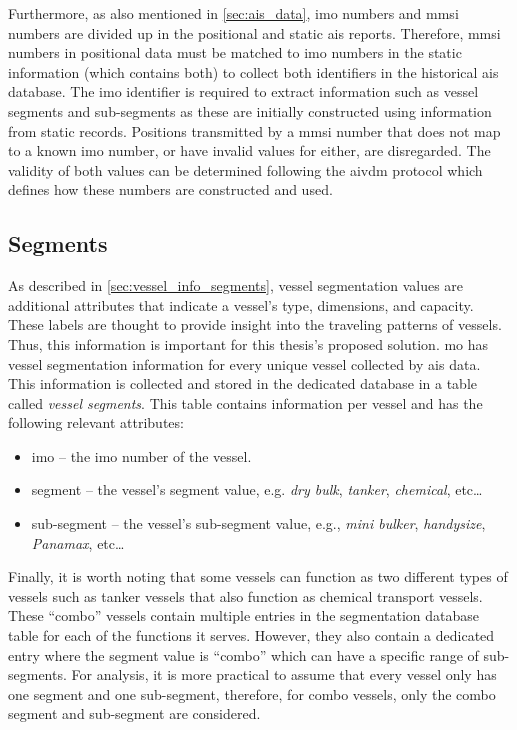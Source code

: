 Furthermore, as also mentioned in \cref{sec:ais_data}, \acrshort{imo} numbers and \acrshort{mmsi} numbers are divided up in the positional and static \acrshort{ais} reports. Therefore, \acrshort{mmsi} numbers in positional data must be matched to \acrshort{imo} numbers in the static information (which contains both) to collect both identifiers in the historical \acrshort{ais} database. The \acrshort{imo} identifier is required to extract information such as vessel segments and sub-segments as these are initially constructed using information from static records. Positions transmitted by a \acrshort{mmsi} number that does not map to a known \acrshort{imo} number, or have invalid values for either, are disregarded. The validity of both values can be determined following the \gls{aivdm} protocol which defines how these numbers are constructed and used.

\subsection{Segments}

As described in \cref{sec:vessel_info_segments}, vessel segmentation values are additional attributes that indicate a vessel's type, dimensions, and capacity. These labels are thought to provide insight into the traveling patterns of vessels. Thus, this information is important for this thesis's proposed solution. \acrshort{mo} has vessel segmentation information for every unique vessel collected by \acrshort{ais} data. This information is collected and stored in the dedicated database in a table called \textit{vessel segments}. This table contains information per vessel and has the following relevant attributes:

\begin{itemize}
    \item imo -- the \acrshort{imo} number of the vessel.
    \item segment -- the vessel's segment value, e.g. \textit{dry bulk}, \textit{tanker}, \textit{chemical}, etc\ldots
    \item sub-segment -- the vessel's sub-segment value, e.g., \textit{mini bulker}, \textit{handysize}, \textit{Panamax}, etc\ldots
\end{itemize}

Finally, it is worth noting that some vessels can function as two different types of vessels such as tanker vessels that also function as chemical transport vessels. These ``combo'' vessels contain multiple entries in the segmentation database table for each of the functions it serves. However, they also contain a dedicated entry where the segment value is ``combo'' which can have a specific range of sub-segments. For analysis, it is more practical to assume that every vessel only has one segment and one sub-segment, therefore, for combo vessels, only the combo segment and sub-segment are considered.

